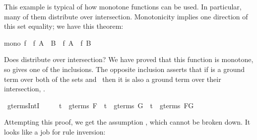 \begin{isabellebody}
\begin{isamarkuptxt}
This example is typical of how monotone functions
 can be used.  In particular, many of them
distribute over intersection.  Monotonicity implies one direction of
this set equality; we have this theorem:
\begin{isabelle}%
mono\ f\ {}\ f\ {}A\ {}\ B{}\ {}\ f\ A\ {}\ f\ B%
\end{isabelle}%
\end{isamarkuptxt}%
\isamarkuptrue%
%
\endisatagproof
{\isafoldproof}%
%
\isadelimproof
%
\endisadelimproof
%
\isamarkuptrue%
%
\begin{isamarkuptext}%
%
Does  distribute over intersection?  We have proved that this
function is monotone, so  gives one of the inclusions.  The
opposite inclusion asserts that if  is a ground term over both of the
sets
 and~ then it is also a ground term over their intersection,
.%
\end{isamarkuptext}%
\isamarkuptrue%
\isamarkupfalse%
\ gterms{}IntI{}\isanewline
\ \ \ \ \ {}t\ {}\ gterms\ F\ {}\ t\ {}\ gterms\ G\ {}\ t\ {}\ gterms\ {}F{}G{}{}%
\isadelimproof
%
\endisadelimproof
%
\isatagproof
%
\endisatagproof
{\isafoldproof}%
%
\isadelimproof
%
\endisadelimproof
%
\begin{isamarkuptext}%
Attempting this proof, we get the assumption 
, which cannot be broken down. 
It looks like a job for rule inversion:%
\end{isamarkuptext}%

\end{isabellebody}
